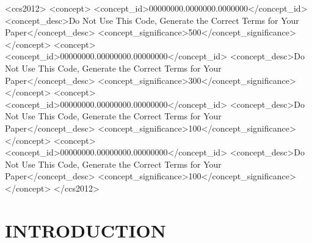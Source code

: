 \documentclass[sigconf,natbib=false]{acmart}
\begin{document}
\begin{CCSXML}
<ccs2012>
 <concept>
  <concept_id>00000000.0000000.0000000</concept_id>
  <concept_desc>Do Not Use This Code, Generate the Correct Terms for Your Paper</concept_desc>
  <concept_significance>500</concept_significance>
 </concept>
 <concept>
  <concept_id>00000000.00000000.00000000</concept_id>
  <concept_desc>Do Not Use This Code, Generate the Correct Terms for Your Paper</concept_desc>
  <concept_significance>300</concept_significance>
 </concept>
 <concept>
  <concept_id>00000000.00000000.00000000</concept_id>
  <concept_desc>Do Not Use This Code, Generate the Correct Terms for Your Paper</concept_desc>
  <concept_significance>100</concept_significance>
 </concept>
 <concept>
  <concept_id>00000000.00000000.00000000</concept_id>
  <concept_desc>Do Not Use This Code, Generate the Correct Terms for Your Paper</concept_desc>
  <concept_significance>100</concept_significance>
 </concept>
</ccs2012>
\end{CCSXML}




\maketitle
\section{INTRODUCTION}
\end{document}
